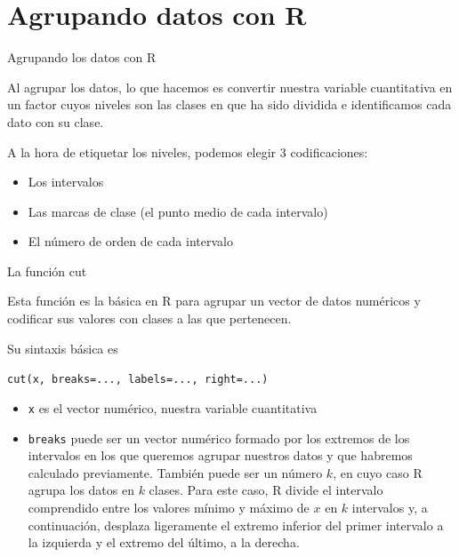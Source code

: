 \documentclass[
  ignorenonframetext,
]{beamer}
\providecommand{\tightlist}{%
  \setlength{\itemsep}{0pt}\setlength{\parskip}{0pt}}
\begin{document}
\hypertarget{agrupando-datos-con-r}{%
\section{Agrupando datos con R}\label{agrupando-datos-con-r}}

\begin{frame}{Agrupando los datos con R}
\protect\hypertarget{agrupando-los-datos-con-r}{}

Al agrupar los datos, lo que hacemos es convertir nuestra variable
cuantitativa en un factor cuyos niveles son las clases en que ha sido
dividida e identificamos cada dato con su clase.

A la hora de etiquetar los niveles, podemos elegir 3 codificaciones:

\begin{itemize}
\tightlist
\item
  Los intervalos
\item
  Las marcas de clase (el punto medio de cada intervalo)
\item
  El número de orden de cada intervalo
\end{itemize}

\end{frame}

\begin{frame}[fragile]{La función cut}
\protect\hypertarget{la-funciuxf3n-cut}{}

Esta función es la básica en R para agrupar un vector de datos numéricos
y codificar sus valores con clases a las que pertenecen.

Su sintaxis básica es

\texttt{cut(x,\ breaks=...,\ labels=...,\ right=...)}

\begin{itemize}
\tightlist
\item
  \texttt{x} es el vector numérico, nuestra variable cuantitativa
\item
  \texttt{breaks} puede ser un vector numérico formado por los extremos
  de los intervalos en los que queremos agrupar nuestros datos y que
  habremos calculado previamente. También puede ser un número \(k\), en
  cuyo caso R agrupa los datos en \(k\) clases. Para este caso, R divide
  el intervalo comprendido entre los valores mínimo y máximo de \(x\) en
  \(k\) intervalos y, a continuación, desplaza ligeramente el extremo
  inferior del primer intervalo a la izquierda y el extremo del último,
  a la derecha.
\end{itemize}

\end{frame}
\end{document}
